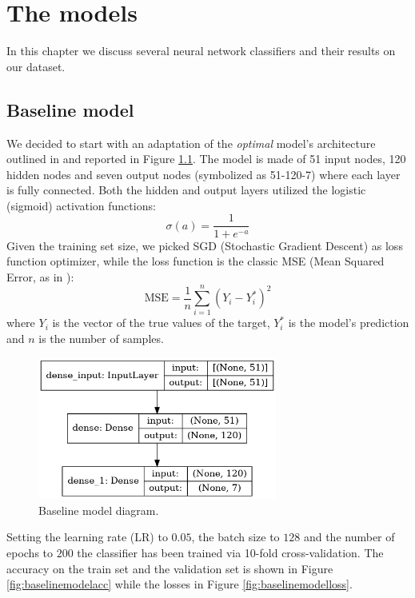\chapter{The models}
In this chapter we discuss several neural network classifiers and their results on our dataset.
\section{Baseline model}
We decided to start with an adaptation of the \textit{optimal} model's architecture outlined in \cite{blackardDean} and reported in Figure \ref{fig:baselinemodel}. The model is made of 51 input nodes, 120 hidden nodes and seven output nodes (symbolized as 51-120-7) where each layer is fully connected. Both the hidden and output layers utilized the logistic (sigmoid) activation functions:
$$
\sigma(a) = \frac{1}{1 + e^{-a}}
$$
Given the training set size, we picked SGD (Stochastic Gradient Descent) as loss function optimizer, while the loss function is the classic MSE (Mean Squared Error, as in \cite{blackardDean}):
\begin{equation}
\text{MSE} = \frac{1}{n}\sum_{i=1}^{n}(Y_i - Y^{*}_{i})^2
\end{equation}
where $Y_i$ is the vector of the true values of the target, $Y^{*}_{i}$ is the model's prediction and $n$ is the number of samples.
\begin{figure}
	\centering
	\includegraphics[width=0.7\textwidth]{./TeX_files/img/baselinemodel.png}
	\caption{Baseline model diagram.}
	\label{fig:baselinemodel}
\end{figure}
Setting the learning rate (LR) to $0.05$, the batch size to $128$ and the number of epochs to $200$ the classifier has been trained via 10-fold cross-validation. The accuracy on the train set and the validation set is shown in Figure \ref{fig:baselinemodelacc} while the losses in Figure \ref{fig:baselinemodelloss}.
